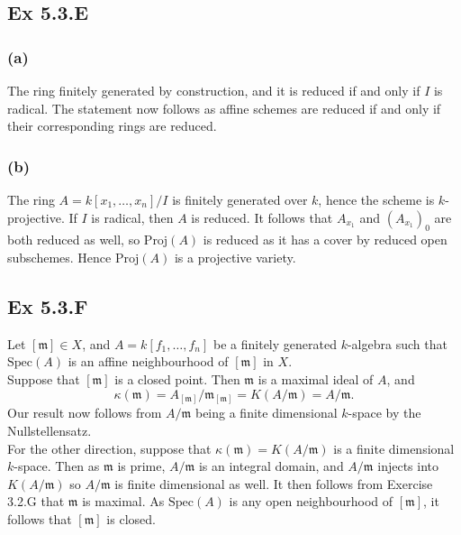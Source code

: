 \documentclass{article}
\theoremstyle{definition}
\newcommand{\Spec}{\text{Spec}}
\newcommand{\Proj}{\text{Proj}}
\begin{document}
\subsection*{Ex 5.3.E}

\subsubsection*{(a)}

The ring finitely generated by construction, and it is reduced if and only if
$I$ is radical. The statement now follows as affine schemes are reduced if and
only if their corresponding rings are reduced.

\subsubsection*{(b)}

The ring $A = k[x_1, \ldots, x_n]/I$ is finitely generated over $k$, hence the
scheme is $k$-projective. If  $I$ is radical, then $A$ is reduced. It follows
that $A_{x_1}$ and $(A_{x_1})_0$ are both reduced as well, so $\Proj(A)$ is
reduced as it has a cover by reduced open subschemes. Hence $\Proj(A)$ is a
projective variety.

\subsection*{Ex 5.3.F}

Let $[\mathfrak{m}] \in X$, and $A = k[f_1, \ldots, f_n]$ be a finitely
generated $k$-algebra such that $\Spec(A)$ is an affine neighbourhood of
$[\mathfrak{m}]$ in $X$. \\

Suppose that $[\mathfrak{m}]$ is a closed point. Then $\mathfrak{m}$ is
a maximal ideal of $A$, and
\[
	\kappa(\mathfrak{m})
	=
	A_{[\mathfrak{m}]}/\mathfrak{m}_{[\mathfrak{m}]}
	=
	K(A/\mathfrak{m})
	=
	A/\mathfrak{m}.
\]
Our result now follows from $A/\mathfrak{m}$ being a finite dimensional
$k$-space by the Nullstellensatz. \\

For the other direction, suppose that $\kappa(\mathfrak{m}) =
	K(A/\mathfrak{m})$ is a finite dimensional $k$-space. Then as $\mathfrak{m}$ is
prime, $A/\mathfrak{m}$ is an integral domain, and $A/\mathfrak{m}$ injects
into $K(A/\mathfrak{m})$ so $A/\mathfrak{m}$ is finite dimensional as well. It
then follows from Exercise 3.2.G that $\mathfrak{m}$ is maximal. As $\Spec(A)$
is any open neighbourhood of $[\mathfrak{m}]$, it follows that $[\mathfrak{m}]$
is closed. \\
\end{document}
